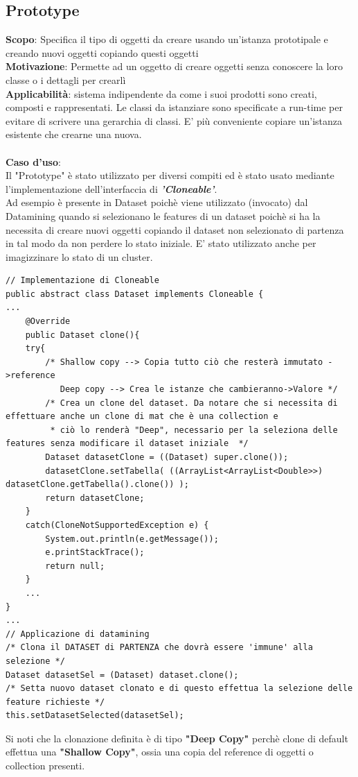 \documentclass[a4paper, oneside]{book}
\begin{document}
\subsection*{Prototype}
\textbf{Scopo}: Specifica il tipo di oggetti da creare usando un'istanza prototipale e creando nuovi oggetti
copiando questi oggetti
\\
\textbf{Motivazione}: Permette ad un oggetto di creare oggetti senza conoscere la loro classe o i dettagli
per crearlì
\\
\textbf{Applicabilità}:  sistema indipendente da come i suoi prodotti sono creati, composti e rappresentati.
Le classi da istanziare sono specificate a run-time per evitare di scrivere una gerarchia di classi. E' più conveniente copiare un'istanza esistente che crearne una nuova. 
\\
\\
\textbf{Caso d'uso}: 
\\
Il "Prototype" è stato utilizzato per diversi compiti ed è stato usato mediante l'implementazione dell'interfaccia di \textit{\textbf{'Cloneable'}}. \\ Ad esempio è presente in Dataset poichè viene utilizzato (invocato) dal Datamining quando si selezionano le features di un dataset poichè si ha la necessita di creare nuovi oggetti copiando il dataset non selezionato di partenza in tal modo da non perdere lo stato iniziale. E' stato utilizzato anche per imagizzinare lo stato di un cluster.

\begin{lstlisting}
// Implementazione di Cloneable
public abstract class Dataset implements Cloneable {
...
    @Override
	public Dataset clone(){
	try{
		/* Shallow copy --> Copia tutto ciò che resterà immutato ->reference
		   Deep copy --> Crea le istanze che cambieranno->Valore */
		/* Crea un clone del dataset. Da notare che si necessita di effettuare anche un clone di mat che è una collection e 
		 * ciò lo renderà "Deep", necessario per la seleziona delle features senza modificare il dataset iniziale  */
		Dataset datasetClone = ((Dataset) super.clone());
		datasetClone.setTabella( ((ArrayList<ArrayList<Double>>) datasetClone.getTabella().clone()) );
		return datasetClone;
	}
	catch(CloneNotSupportedException e) {
		System.out.println(e.getMessage());
		e.printStackTrace();
		return null; 
	}
	...
}
...
// Applicazione di datamining
/* Clona il DATASET di PARTENZA che dovrà essere 'immune' alla selezione */
Dataset datasetSel = (Dataset) dataset.clone();
/* Setta nuovo dataset clonato e di questo effettua la selezione delle feature richieste */
this.setDatasetSelected(datasetSel);
\end{lstlisting}
Si noti che la clonazione definita è di tipo \textbf{"Deep Copy"} perchè clone di default effettua una \textbf{"Shallow Copy"}, ossia una copia del reference di oggetti o collection presenti. 
\end{document}
